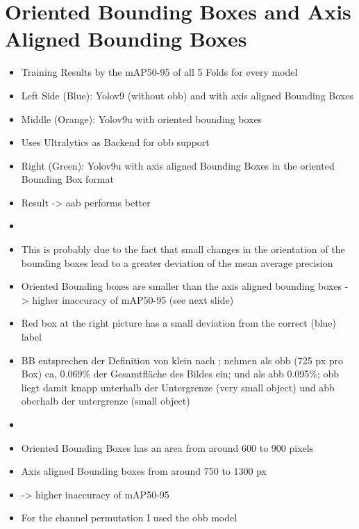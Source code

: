 \section{Oriented Bounding Boxes and Axis Aligned Bounding Boxes}
\begin{itemize}
    \item Training Results by the mAP50-95 of all 5 Folds for every model 
    \item Left Side (Blue): Yolov9 (without obb) and with axis aligned Bounding Boxes
    \item Middle (Orange): Yolov9u with oriented bounding boxes
    \item Uses Ultralytics as Backend for obb support
    \item Right (Green): Yolov9u with axis aligned Bounding Boxes in the oriented Bounding Box format
    \item Result -> aab performs better
    \item {}
    \item This is probably due to the fact that small changes in the orientation of the bounding boxes lead to a greater deviation of the mean average precision 
    \item Oriented Bounding boxes are smaller than the axis aligned bounding boxes -> higher inaccuracy of mAP50-95 (see next slide)
    \item Red box at the right picture has a small deviation from the correct (blue) label
    \item BB entsprechen der Definition von klein nach \cite{Chen2017}; nehmen als obb (725 px pro Box) ca, 0.069\% der Gesamtfläche des Bildes ein; und als abb 0.095\%; obb liegt damit knapp unterhalb der Untergrenze (very small object) und abb oberhalb der untergrenze (small object)
\end{itemize}
\begin{itemize}
    \item {}
    \item Oriented Bounding Boxes has an area from around 600 to 900 pixels 
    \item Axis aligned Bounding boxes from around 750 to 1300 px
    \item-> higher inaccuracy of mAP50-95

    \item For the channel permutation I used the obb model

\end{itemize}

